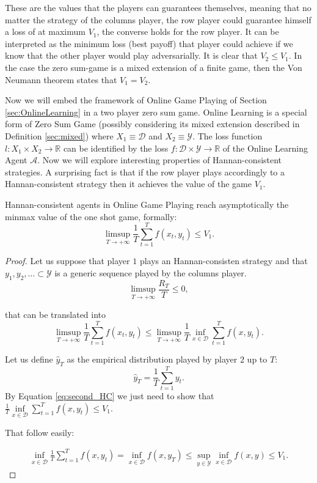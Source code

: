These are the values that the players can guarantees themselves, meaning that no matter the strategy of the columns player, the row player could guarantee himself a loss of at maximum $V_1$, the converse holds for the row player. It can be interpreted as the minimum loss (best payoff) that player could achieve if we know that the other player would play adversarially. It is clear that $V_2\le V_1$. In the case the zero sum-game is a mixed extension of a finite game, then the Von Neumann theorem states that $V_1=V_2$.
 
Now we will embed the framework of Online Game Playing of Section \ref{sec:OnlineLearning} in a two player zero sum game. 
Online Learning is a special form of Zero Sum Game (possibly considering its mixed extension described in Definition \ref{sec:mixed}) where $X_1\equiv \mathcal D$ and $X_2\equiv \mathcal Y$. The loss function $l:X_1\times X_2\to\mathbb R$ can be identified by the loss $f:\mathcal D\times \mathcal Y\to\mathbb R$ of the Online Learning Agent $\mathcal A$.
Now we will explore interesting properties of Hannan-consistent strategies. A surprising fact is that if the row player plays accordingly to a Hannan-consistent strategy then it achieves the value of the game $V_1$. 

\begin{theorem}
    Hannan-consistent agents in Online Game Playing reach asymptotically the minmax value of the one shot game, formally:
    $$\limsup\limits_{T\to +\infty}\frac{1}{T}\sum\limits_{t=1}^Tf(x_t,y_t)\le V_1.$$
\end{theorem}

\begin{proof}
    Let us suppose that player $1$ plays an Hannan-consisten strategy and that $y_1,y_2,\ldots \subset \mathcal Y$ is a generic sequence played by the columns player.
    \begin{equation}
        \limsup\limits_{T\to+\infty}\frac{R_T}{T}\le0,
    \end{equation}
    
    that can be translated into 
    \begin{equation}\label{eq:second_HC}
        \limsup\limits_{T\to+\infty}\frac{1}{T}\sum\limits_{t=1}^Tf(x_t,y_t)\le\limsup\limits_{T\to+\infty}\frac{1}{T}\inf\limits_{x\in\mathcal D}\sum\limits_{t=1}^Tf(x,y_t).
    \end{equation}

    Let us define $\hat y_T$ as the empirical distribution played by player $2$ up to $T$:
    $$\hat y_T=\frac{1}{T}\sum\limits_{t=1}^Ty_t.$$
    By Equation \eqref{eq:second_HC} we just need to show that $\frac{1}{T}\inf\limits_{x\in \mathcal D} \sum\limits_{t=1}^T f(x,y_t)\le V_1.$

    That follow easily:

    \begin{align}
        \inf\limits_{x\in\mathcal D}\frac{1}{T}\sum\limits_{t=1}^T f(x,y_t)=\inf\limits_{x\in\mathcal D} f(x,y_T)\le\sup\limits_{y\in\mathcal Y}\inf\limits_{x\in\mathcal D} f(x,y)\le V_1.
    \end{align}
\end{proof}

